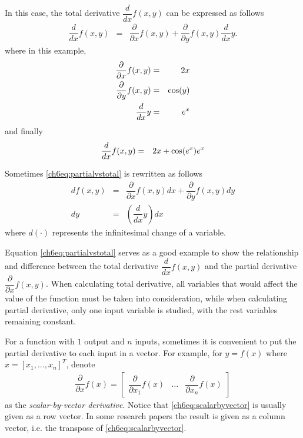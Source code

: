 In this case, the total derivative $\dfrac{d}{dx}f(x, y)$ can be expressed as follows
\begin{eqnarray}
	\dfrac{d}{dx}f(x, y) &=& \dfrac{\partial}{\partial x} f(x, y) + \dfrac{\partial}{\partial y}f(x, y) \dfrac{d}{dx}y. \label{ch6eq:partialvstotal}
\end{eqnarray}
where in this example,
\begin{eqnarray}
	\dfrac{\partial}{\partial x} f(x, y) &=& 2x \nonumber \\
	\dfrac{\partial}{\partial y} f(x, y) &=& \textup{cos}(y) \nonumber \\
	\dfrac{d}{dx}y &=& e^x \nonumber
\end{eqnarray}
and finally
\begin{eqnarray}
	\dfrac{d}{dx}f(x, y) &=& 2x + \textup{cos}(e^x)e^x \nonumber
\end{eqnarray}

Sometimes \eqref{ch6eq:partialvstotal} is rewritten as follows
\begin{eqnarray}
	df(x, y) &=& \dfrac{\partial}{\partial x} f(x, y) dx + \dfrac{\partial}{\partial y}f(x, y) dy \nonumber \\
	dy &=& \left(\dfrac{d}{dx}y\right) dx \nonumber
\end{eqnarray}
where $d(\cdot)$ represents the infinitesimal change of a variable.

Equation \eqref{ch6eq:partialvstotal} serves as a good example to show the relationship and difference between the total derivative $\dfrac{d}{dx}f(x, y)$ and the partial derivative $\dfrac{\partial}{\partial x} f(x, y)$. When calculating total derivative, all variables that would affect the value of the function must be taken into consideration, while when calculating partial derivative, only one input variable is studied, with the rest variables remaining constant.  

For a function with $1$ output and $n$ inputs, sometimes it is convenient to put the partial derivative to each input in a vector. For example, for $y=f(x)$ where $x = \left[x_1,...,x_n\right]^T$, denote
\begin{eqnarray}
	\dfrac{\partial}{\partial x}f(x) = \left[\begin{array}{ccc}
	\dfrac{\partial}{\partial x_1}f(x) &
	\ldots &
	\dfrac{\partial}{\partial x_n}f(x)
	\end{array}\right] \label{ch6eq:scalarbyvector}
\end{eqnarray}
as the \textit{scalar-by-vector derivative}. Notice that \eqref{ch6eq:scalarbyvector} is usually given as a row vector. In some research papers the result is given as a column vector, i.e. the transpose of \eqref{ch6eq:scalarbyvector}.

